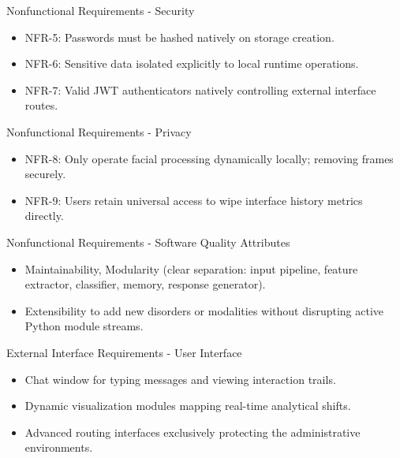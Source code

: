 \documentclass{beamer}
\begin{document}
\begin{frame}{Nonfunctional Requirements - Security}
\begin{itemize}
    \item NFR-5: Passwords must be hashed natively on storage creation.
    \item NFR-6: Sensitive data isolated explicitly to local runtime operations.
    \item NFR-7: Valid JWT authenticators natively controlling external interface routes.
\end{itemize}
\end{frame}

\begin{frame}{Nonfunctional Requirements - Privacy}
\begin{itemize}
    \item NFR-8: Only operate facial processing dynamically locally; removing frames securely.
    \item NFR-9: Users retain universal access to wipe interface history metrics directly.
\end{itemize}
\end{frame}

\begin{frame}{Nonfunctional Requirements - Software Quality Attributes}
\begin{itemize}
    \item Maintainability, Modularity (clear separation: input pipeline, feature extractor, classifier, memory, response generator).
    \item Extensibility to add new disorders or modalities without disrupting active Python module streams.
\end{itemize}
\end{frame}


\begin{frame}{External Interface Requirements - User Interface}
\begin{itemize}
    \item Chat window for typing messages and viewing interaction trails.
    \item Dynamic visualization modules mapping real-time analytical shifts.
    \item Advanced routing interfaces exclusively protecting the administrative environments.
\end{itemize}
\end{frame}
\end{document}
